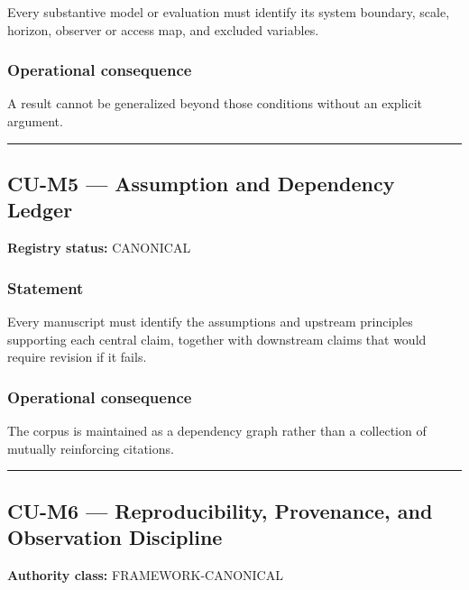 \documentclass[
  11pt,
]{article}
\begin{document}
Every substantive model or evaluation must identify its system boundary,
scale, horizon, observer or access map, and excluded variables.

\subsubsection{Operational
consequence}\label{operational-consequence-12}

A result cannot be generalized beyond those conditions without an
explicit argument.

\begin{center}\rule{0.5\linewidth}{0.5pt}\end{center}

\subsection{CU-M5 --- Assumption and Dependency
Ledger}\label{cu-m5-assumption-and-dependency-ledger}

\textbf{Registry status:} CANONICAL

\subsubsection{Statement}\label{statement-13}

Every manuscript must identify the assumptions and upstream principles
supporting each central claim, together with downstream claims that
would require revision if it fails.

\subsubsection{Operational
consequence}\label{operational-consequence-13}

The corpus is maintained as a dependency graph rather than a collection
of mutually reinforcing citations.

\begin{center}\rule{0.5\linewidth}{0.5pt}\end{center}

\subsection{CU-M6 --- Reproducibility, Provenance, and Observation
Discipline}\label{cu-m6-reproducibility-provenance-and-observation-discipline}

\textbf{Authority class:} FRAMEWORK-CANONICAL
\end{document}
